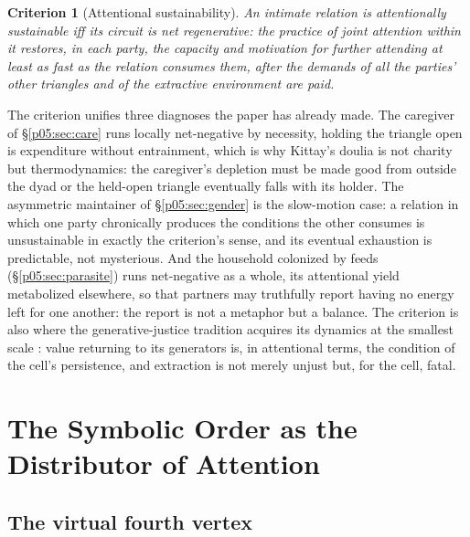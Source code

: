 \documentclass[11pt,a4paper]{article}
\theoremstyle{seriesthm}
\newtheorem{crit}{Criterion}
\begin{document}
\begin{crit}[Attentional sustainability]\label{p05:crit:sustain}
An intimate relation is attentionally sustainable iff its circuit is net regenerative: the practice of joint attention within it restores, in each party, the capacity and motivation for further attending at least as fast as the relation consumes them, after the demands of all the parties' other triangles and of the extractive environment are paid.
\end{crit}

The criterion unifies three diagnoses the paper has already made. The caregiver of §\ref{p05:sec:care} runs locally net-negative by necessity, holding the triangle open is expenditure without entrainment, which is why Kittay's doulia is not charity but thermodynamics: the caregiver's depletion must be made good from outside the dyad or the held-open triangle eventually falls with its holder. The asymmetric maintainer of §\ref{p05:sec:gender} is the slow-motion case: a relation in which one party chronically produces the conditions the other consumes is unsustainable in exactly the criterion's sense, and its eventual exhaustion is predictable, not mysterious. And the household colonized by feeds (§\ref{p05:sec:parasite}) runs net-negative as a whole, its attentional yield metabolized elsewhere, so that partners may truthfully report having no energy left for one another: the report is not a metaphor but a balance. The criterion is also where the generative-justice tradition acquires its dynamics at the smallest scale \parencite{eglash2016}: value returning to its generators is, in attentional terms, the condition of the cell's persistence, and extraction is not merely unjust but, for the cell, fatal.

\section{The Symbolic Order as the Distributor of Attention}
\label{p05:sec:symbolicdist}

\subsection{The virtual fourth vertex}
\label{p05:sec:fourth}
\end{document}
